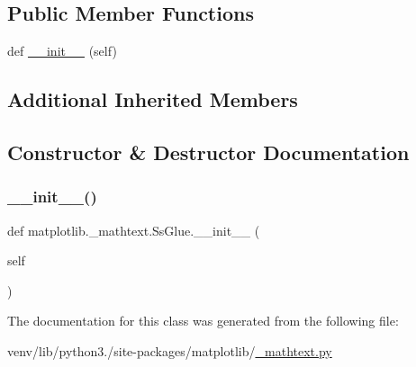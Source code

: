 \subsection*{Public Member Functions}
\begin{DoxyCompactItemize}
\item 
def \hyperlink{classmatplotlib_1_1__mathtext_1_1SsGlue_a83e5af90059b43e81183968c5731f534}{\+\_\+\+\_\+init\+\_\+\+\_\+} (self)
\end{DoxyCompactItemize}
\subsection*{Additional Inherited Members}


\subsection{Constructor \& Destructor Documentation}
\mbox{\label{classmatplotlib_1_1__mathtext_1_1SsGlue_a83e5af90059b43e81183968c5731f534}} 
\subsubsection{\texorpdfstring{\+\_\+\+\_\+init\+\_\+\+\_\+()}{\_\_init\_\_()}}
{\footnotesize\ttfamily def matplotlib.\+\_\+mathtext.\+Ss\+Glue.\+\_\+\+\_\+init\+\_\+\+\_\+ (\begin{DoxyParamCaption}\item[{}]{self }\end{DoxyParamCaption})}



The documentation for this class was generated from the following file\+:\begin{DoxyCompactItemize}
\item 
venv/lib/python3./site-\/packages/matplotlib/\hyperlink{__mathtext_8py}{\+\_\+mathtext.\+py}\end{DoxyCompactItemize}
